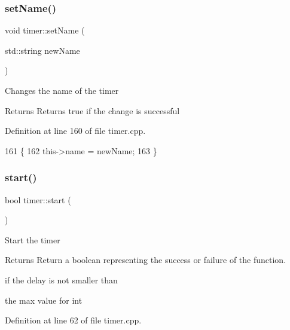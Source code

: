 \subsubsection{\texorpdfstring{set\+Name()}{setName()}}
{\footnotesize\ttfamily void timer\+::set\+Name (\begin{DoxyParamCaption}\item[{std\+::string}]{new\+Name }\end{DoxyParamCaption})}

Changes the name of the timer \begin{DoxyReturn}{Returns}
Returns true if the change is successful 
\end{DoxyReturn}


Definition at line 160 of file timer.\+cpp.


\begin{DoxyCode}
161 \{
162     this->name = newName;
163 \}
\end{DoxyCode}
\mbox{\label{classtimer_adad85b4705278d4cb8a2a4f3286cc2c7}} 
\subsubsection{\texorpdfstring{start()}{start()}}
{\footnotesize\ttfamily bool timer\+::start (\begin{DoxyParamCaption}{ }\end{DoxyParamCaption})}

Start the timer \begin{DoxyReturn}{Returns}
Return a boolean representing the success or failure of the function. 
\end{DoxyReturn}
if the delay is not smaller than

the max value for int 

Definition at line 62 of file timer.\+cpp.


